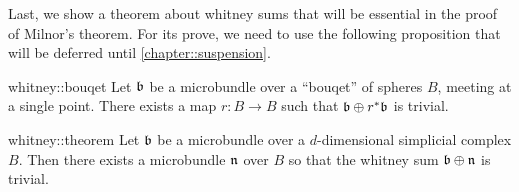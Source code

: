 \begin{myparagraph}
    Last, we show a theorem about whitney sums that will be essential in the proof of Milnor's theorem.
    For its prove, we need to use the following proposition that will be deferred until \autoref{chapter::suspension}.
\end{myparagraph}

\begin{myproposition}{whitney::bouqet}
    Let $\mathfrak{b}$ be a microbundle over a ``bouqet'' of spheres $B$, meeting at a single point.
    There exists a map $r: B \to B$ such that $\mathfrak{b} \oplus{} r^*\mathfrak{b}$ is trivial.
\end{myproposition}

\begin{mytheorem}{whitney::theorem}
    Let $\mathfrak{b}$ be a microbundle over a $d$-dimensional simplicial complex $B$.
    Then there exists a microbundle $\mathfrak{n}$ over $B$ so that the whitney sum $\mathfrak{b} \oplus{} \mathfrak{n}$ is trivial.
\end{mytheorem}

